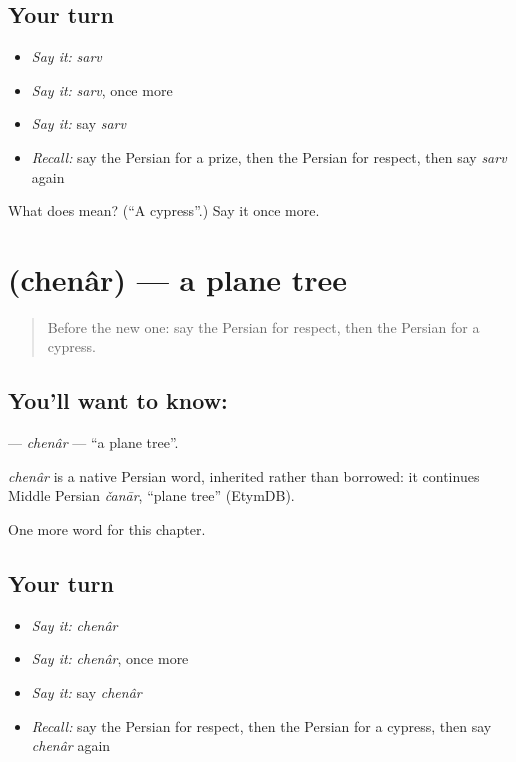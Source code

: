 \subsection*{Your turn}
\begin{itemize}
\raggedright
  \item \emph{Say it:} \emph{sarv}
  \item \emph{Say it:} \emph{sarv}, once more
  \item \emph{Say it:} say \emph{sarv}
  \item \emph{Recall:} say the Persian for a prize, then the Persian for respect, then say \emph{sarv} again
\end{itemize}

\begin{tcolorbox}[breakable,colback=teal!4,colframe=teal!35!black,title={Before you move on}]
What does  mean? (\textquotedblleft{}A cypress\textquotedblright{}.) Say it once more.
\end{tcolorbox}
\section[\texorpdfstring{\fa{چنار} (chenâr)}{چنار (chenâr)}]{ (chenâr) — a plane tree}

\label{lesson:FA-C279-chenar}



\begin{quote}
Before the new one: say the Persian for respect, then the Persian for a cypress.
\end{quote}

\subsection*{You'll want to know: }
\textbf{} — \emph{chenâr} — \textquotedblleft{}a plane tree\textquotedblright{}.

\begin{cousinweb}
\emph{chenâr} is a native Persian word, inherited rather than borrowed: it continues Middle Persian \emph{čanār}, \textquotedblleft{}plane tree\textquotedblright{} (EtymDB).
\end{cousinweb}

\begin{grammarlens}[title={What you've built}]
One more word for this chapter.
\end{grammarlens}

\subsection*{Your turn}
\begin{itemize}
\raggedright
  \item \emph{Say it:} \emph{chenâr}
  \item \emph{Say it:} \emph{chenâr}, once more
  \item \emph{Say it:} say \emph{chenâr}
  \item \emph{Recall:} say the Persian for respect, then the Persian for a cypress, then say \emph{chenâr} again
\end{itemize}

